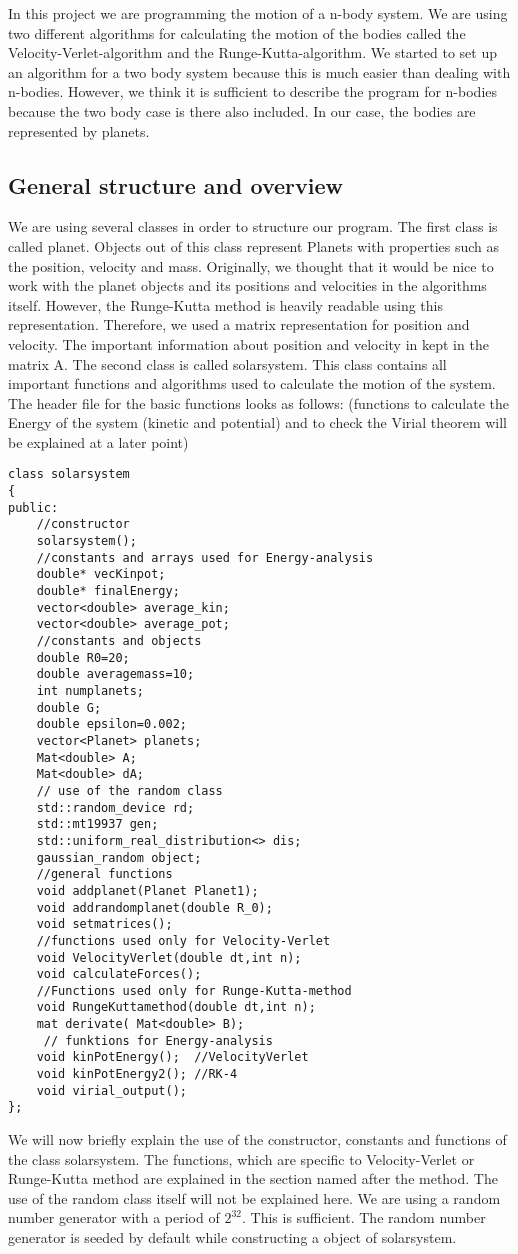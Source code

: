 \documentclass[10pt,a4paper]{article}
\begin{document}
In this project we are programming the motion of a n-body system. We are using two different algorithms for calculating the motion of the bodies called the Velocity-Verlet-algorithm and the Runge-Kutta-algorithm. 
We started to set up an algorithm for a two body system because this is much easier than dealing with n-bodies. However, we think it is sufficient to describe the program for n-bodies because the two body case is there also included. In our case, the bodies are represented by planets. 
\subsection{General structure and overview}
We are using several classes in order to structure our program. The first class is called planet. Objects out of this class represent Planets with properties such as the position, velocity and mass. Originally, we thought that it would be nice to work with the planet objects and its positions and velocities in the algorithms itself. However, the Runge-Kutta method is heavily readable using this representation. Therefore, we used a matrix representation for position and velocity. The important information about position and velocity in kept in the matrix A. 
The second class is called solarsystem. This class contains all important functions and algorithms used to calculate the motion of the system. 
The header file for the basic functions looks as follows: (functions to calculate the Energy of the system (kinetic and potential) and to check the Virial theorem will be explained at a later point)
\begin{lstlisting}
class solarsystem
{
public:
    //constructor
    solarsystem();
    //constants and arrays used for Energy-analysis
    double* vecKinpot;
    double* finalEnergy;
    vector<double> average_kin; 
    vector<double> average_pot; 
    //constants and objects
    double R0=20;
    double averagemass=10;
    int numplanets;
    double G;
    double epsilon=0.002;
    vector<Planet> planets;
    Mat<double> A;
    Mat<double> dA;
    // use of the random class
    std::random_device rd;
    std::mt19937 gen;
    std::uniform_real_distribution<> dis;
    gaussian_random object;
    //general functions
    void addplanet(Planet Planet1);
    void addrandomplanet(double R_0);
    void setmatrices();
    //functions used only for Velocity-Verlet
    void VelocityVerlet(double dt,int n);
    void calculateForces();
    //Functions used only for Runge-Kutta-method
    void RungeKuttamethod(double dt,int n);
    mat derivate( Mat<double> B);
     // funktions for Energy-analysis
    void kinPotEnergy();  //VelocityVerlet
    void kinPotEnergy2(); //RK-4
    void virial_output();
};
\end{lstlisting}
We will now briefly explain the use of the constructor, constants and functions of the class solarsystem. The functions, which are specific to Velocity-Verlet or Runge-Kutta method are explained in the section named after the method. The use of the random class itself will not be explained here. We are using a random number generator with a period of $2^{32}$. This is sufficient. The random number generator is seeded by default while constructing a object of solarsystem. 
\end{document}
